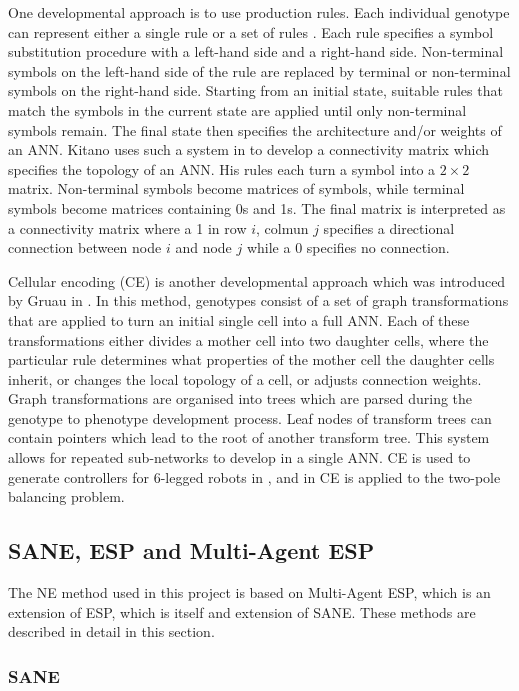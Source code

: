 \documentclass[12pt]{article} %
\begin{document}
One developmental approach is to use production rules. Each individual genotype can represent either a single rule or a set of rules \cite{Yao1999}. Each rule specifies a symbol substitution procedure with a left-hand side and a right-hand side. Non-terminal symbols on the left-hand side of the rule are replaced by terminal or non-terminal symbols on the right-hand side. Starting from an initial state, suitable rules that match the symbols in the current state are applied until only non-terminal symbols remain. The final state then specifies the architecture and/or weights of an ANN. Kitano uses such a system in \cite{Kitano1990} to develop a connectivity matrix which specifies the topology of an ANN. His rules each turn a symbol into a $2\times{}2$ matrix. Non-terminal symbols become matrices of symbols, while terminal symbols become matrices containing 0s and 1s. The final matrix is interpreted as a connectivity matrix where a 1 in row $i$, colmun $j$ specifies a directional connection between node $i$ and node $j$ while a 0 specifies no connection.

Cellular encoding (CE) is another developmental approach which was introduced by Gruau in \cite{Gruau1992}. In this method, genotypes consist of a set of graph transformations that are applied to turn an initial single cell into a full ANN. Each of these transformations either divides a mother cell into two daughter cells, where the particular rule determines what properties of the mother cell the daughter cells inherit, or changes the local topology of a cell, or adjusts connection weights. Graph transformations are organised into trees which are parsed during the genotype to phenotype development process. Leaf nodes of transform trees can contain pointers which lead to the root of another transform tree. This system allows for repeated sub-networks to develop in a single ANN. CE is used to generate controllers for 6-legged robots in \cite{Gruau1994}, and in \cite{Gruau1996} CE is applied to the two-pole balancing problem.

\subsection{SANE, ESP and Multi-Agent ESP}

The NE method used in this project is based on Multi-Agent ESP, which is an extension of ESP, which is itself and extension of SANE. These methods are described in detail in this section.

\subsubsection{SANE}
\end{document}
